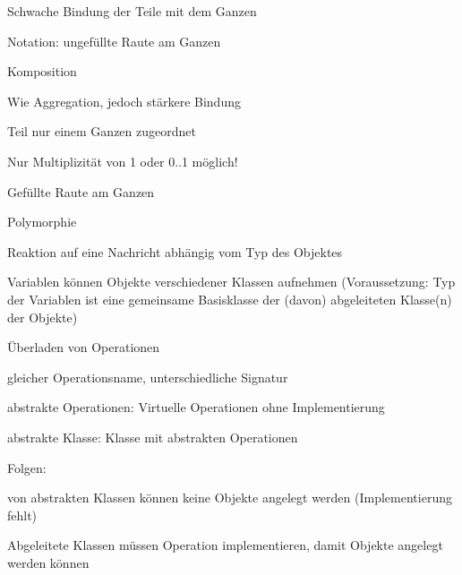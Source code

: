 \documentclass[a4paper]{article}
\begin{document}
\begin{multicols}{3}
\begin{itemize*}
\begin{itemize*}
\begin{itemize*}
        \item Schwache Bindung der Teile mit dem Ganzen
        \item Notation: ungefüllte Raute am Ganzen
      \end{itemize*}
      \item Komposition
      \begin{itemize*}
        \item Wie Aggregation, jedoch stärkere Bindung
        \item Teil nur einem Ganzen zugeordnet
        \item Nur Multiplizität von 1 oder 0..1 möglich!
        \item Gefüllte Raute am Ganzen
      \end{itemize*}
      \item Polymorphie
      \begin{itemize*}
        \item Reaktion auf eine Nachricht abhängig vom Typ des Objektes
        \item Variablen können Objekte verschiedener Klassen aufnehmen (Voraussetzung: Typ der Variablen ist eine gemeinsame Basisklasse der (davon) abgeleiteten Klasse(n) der Objekte)
        \item Überladen von Operationen
        \item gleicher Operationsname, unterschiedliche Signatur
        \item abstrakte Operationen: Virtuelle Operationen ohne Implementierung
        \item abstrakte Klasse: Klasse mit abstrakten Operationen
        \item Folgen:
        \item von abstrakten Klassen können keine Objekte angelegt werden (Implementierung fehlt)
        \item Abgeleitete Klassen müssen Operation implementieren, damit Objekte angelegt werden können
      \end{itemize*}
    \end{itemize*}
  \end{itemize*}


\end{multicols}
\end{document}
